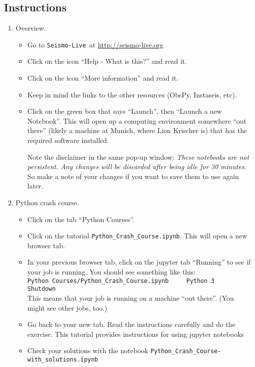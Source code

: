 \documentclass[11pt,titlepage,fleqn]{article}
\newcommand{\slive}{{\tt Seismo-Live}}
\newcommand{\sliveurl}{\url{http://seismo-live.org}}
\begin{document}

\subsection*{Instructions}

\begin{enumerate}
\item Overview.
\begin{itemize}
\item Go to \slive\ at \sliveurl\
\item Click on the icon ``Help - What is this?'' and read it.
\item Click on the icon ``More information'' and read it.
\item Keep in mind the links to the other resources (ObsPy, Instaseis, etc).
\item Click on the green box that says ``Launch'', then ``Launch a new Notebook''. This will open up a computing environment somewhere ``out there'' (likely a machine at Munich, where Lion Krischer is) that has the required software installed.

Note the disclaimer in the same pop-up window: {\em These notebooks are not persistent. Any changes will be discarded after being idle for 30 minutes.} So make a note of your changes if you want to save them to use again later.
\end{itemize}

\pagebreak
\item Python crash course.
\begin{itemize}
\item Click on the tab ``Python Courses''.
\item Click on the tutorial \verb+Python_Crash_Course.ipynb+. This will open a new browser tab.
\item In your previous browser tab, click on the jupyter tab ``Running'' to see if your job is running. You should see something like this: \\
\verb+Python Courses/Python_Crash_Course.ipynb     Python 3   Shutdown+ \\
This means that your job is running on a machine ``out there''. (You might see other jobs, too.)

\item Go back to your new tab. Read the instructions carefully and do the exercise.
This tutorial provides instructions for using jupyter notebooks

\item Check your solutions with the notebook \verb+Python_Crash_Course-with_solutions.ipynb+
\end{itemize}


\end{enumerate}
\end{document}
